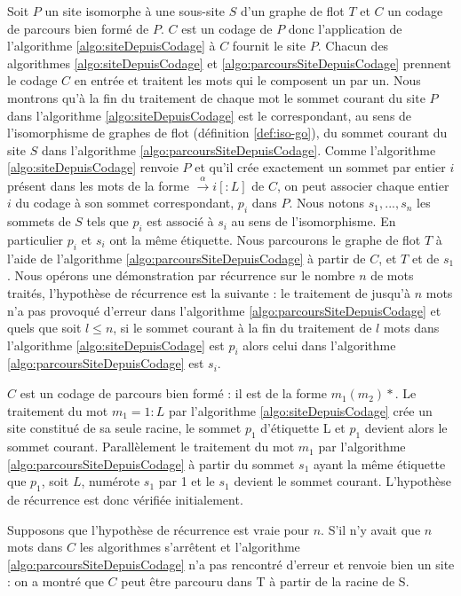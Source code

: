 \begin{pr}
Soit $P$ un site isomorphe à une sous-site $S$ d'un graphe de flot $T$ et $C$ un codage de parcours bien formé de $P$.
$C$ est un codage de $P$ donc l'application de l'algorithme \ref{algo:siteDepuisCodage} à $C$ fournit le site $P$.
Chacun des algorithmes \ref{algo:siteDepuisCodage} et \ref{algo:parcoursSiteDepuisCodage} prennent le codage $C$ en entrée et traitent les mots qui le composent un par un.
Nous montrons qu'à la fin du traitement de chaque mot le sommet courant du site $P$ dans l'algorithme \ref{algo:siteDepuisCodage} est le correspondant, au sens de l'isomorphisme de graphes de flot (définition \ref{def:iso-go}), du sommet courant du site $S$ dans l'algorithme \ref{algo:parcoursSiteDepuisCodage}.
Comme l'algorithme \ref{algo:siteDepuisCodage} renvoie $P$ et qu'il crée exactement un sommet par entier $i$ présent dans les mots de la forme $\xrightarrow{\alpha}i[:L]$ de $C$, on peut associer chaque entier $i$ du codage à son sommet correspondant, $p_i$ dans $P$.
Nous notons $s_1, ..., s_n$ les sommets de $S$ tels que $p_i$ est associé à $s_i$ au sens de l'isomorphisme. En particulier $p_i$ et $s_i$ ont la même étiquette.
Nous parcourons le graphe de flot $T$ à l'aide de l'algorithme \ref{algo:parcoursSiteDepuisCodage} à partir de $C$, et $T$ et de $s_1$.
Nous opérons une démonstration par récurrence sur le nombre $n$ de mots traités, l'hypothèse de récurrence est la suivante : 
le traitement de jusqu'à $n$ mots n'a pas provoqué d'erreur dans l'algorithme \ref{algo:parcoursSiteDepuisCodage} et quels que soit $l\le n$, si le sommet courant à la fin du traitement de $l$ mots dans l'algorithme \ref{algo:siteDepuisCodage} est $p_i$ alors celui dans l'algorithme \ref{algo:parcoursSiteDepuisCodage} est $s_i$.

$C$ est un codage de parcours bien formé : il est de la forme $m_1(m_2)*$. Le traitement du mot $m_1=1:L$ par l'algorithme \ref{algo:siteDepuisCodage} crée un site constitué de sa seule racine, le sommet $p_1$ d'étiquette L et $p_1$ devient alors le sommet courant.
Parallèlement le traitement du mot $m_1$ par l'algorithme \ref{algo:parcoursSiteDepuisCodage} à partir du sommet $s_1$ ayant la même étiquette que $p_1$, soit $L$, numérote $s_1$ par 1 et le $s_1$ devient le sommet courant.
L'hypothèse de récurrence est donc vérifiée initialement.

Supposons que l'hypothèse de récurrence est vraie pour $n$.
S'il n'y avait que $n$ mots dans $C$ les algorithmes s'arrêtent et l'algorithme \ref{algo:parcoursSiteDepuisCodage} n'a pas rencontré d'erreur et renvoie bien un site : on a montré que $C$ peut être parcouru dans T à partir de la racine de S.


\end{pr}
